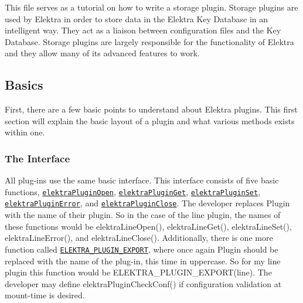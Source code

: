 This file serves as a tutorial on how to write a storage plugin. Storage plugins are used by Elektra in order to store data in the Elektra Key Database in an intelligent way. They act as a liaison between configuration files and the Key Database. Storage plugins are largely responsible for the functionality of Elektra and they allow many of its advanced features to work.

\subsection*{Basics}

First, there are a few basic points to understand about Elektra plugins. This first section will explain the basic layout of a plugin and what various methods exists within one.

\subsubsection*{The Interface}

All plug-\/ins use the same basic interface. This interface consists of five basic functions, \href{https://doc.libelektra.org/api/current/html/group__plugin.html#ga23c2eb3584e38a4d494eb8f91e5e3d8d}{\tt elektra\+Plugin\+Open}, \href{https://doc.libelektra.org/api/current/html/group__plugin.html#gacb69f3441c6d84241b4362f958fbe313}{\tt elektra\+Plugin\+Get}, \href{https://doc.libelektra.org/api/current/html/group__plugin.html#gae65781a1deb34efc79c8cb9d9174842c}{\tt elektra\+Plugin\+Set}, \href{https://doc.libelektra.org/api/current/html/group__plugin.html#gad74b35f558ac7c3262f6069c5c47dc79}{\tt elektra\+Plugin\+Error}, and \href{https://doc.libelektra.org/api/current/html/group__plugin.html#ga1236aefe5b2baf8b7bf636ba5aa9ea29}{\tt elektra\+Plugin\+Close}. The developer replaces {\ttfamily Plugin} with the name of their plugin. So in the case of the line plugin, the names of these functions would be {\ttfamily elektra\+Line\+Open()}, {\ttfamily elektra\+Line\+Get()}, {\ttfamily elektra\+Line\+Set()}, {\ttfamily elektra\+Line\+Error()}, and {\ttfamily elektra\+Line\+Close()}. Additionally, there is one more function called \href{https://doc.libelektra.org/api/current/html/group__plugin.html#ga8dd092048e972a3f0c9c9f54eb41576e}{\tt E\+L\+E\+K\+T\+R\+A\+\_\+\+P\+L\+U\+G\+I\+N\+\_\+\+E\+X\+P\+O\+RT}, where once again {\ttfamily Plugin} should be replaced with the name of the plug-\/in, this time in uppercase. So for my line plugin this function would be {\ttfamily E\+L\+E\+K\+T\+R\+A\+\_\+\+P\+L\+U\+G\+I\+N\+\_\+\+E\+X\+P\+O\+R\+T(line)}. The developer may define {\ttfamily elektra\+Plugin\+Check\+Conf()} if configuration validation at mount-\/time is desired.


